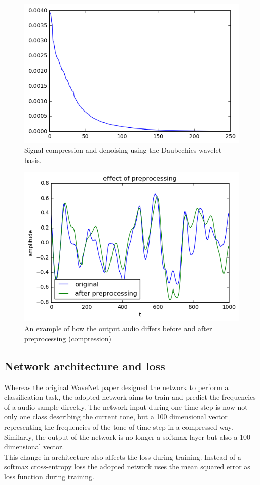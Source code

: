 \documentclass[10pt,conference,compsocconf]{IEEEtran}
\begin{document}
\begin{figure}[htbp]
  \centering
  \includegraphics[width=\columnwidth]{figures/pca_explained_variance}
  \caption{Signal compression and denoising using the Daubechies wavelet basis.}
  \label{fig:pca_explained_variance}
\end{figure}

\begin{figure}[tbp]
  \centering
  \includegraphics[width=\columnwidth]{figures/preprocessing_difference_waveform}
  \caption{An example of how the output audio differs before and after preprocessing (compression)}
  \label{fig:preprocessing_difference_waveform}
\end{figure}

\subsection{Network architecture and loss}
Whereas the original WaveNet paper designed the network to perform a classification task, the adopted network aims to train and predict the frequencies of a audio sample directly. The network input during one time step is now not only one class describing the current tone, but a 100 dimensional vector representing the frequencies of the tone of time step in a compressed way. Similarly, the output of the network is no longer a softmax layer but also a 100 dimensional vector.\\
This change in architecture also affects the loss during training. Instead of a softmax cross-entropy loss the adopted network uses the mean squared error as loss function during training.
\end{document}
